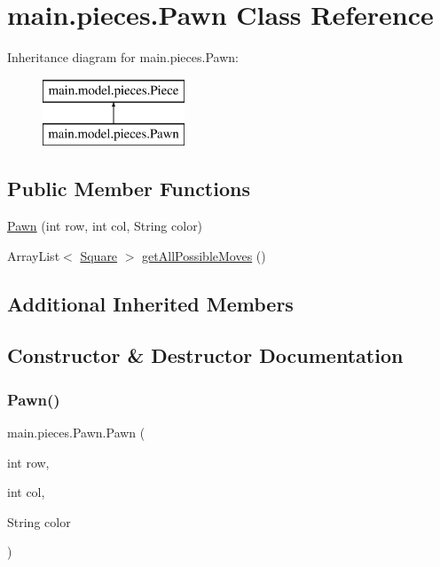 \hypertarget{classmain_1_1pieces_1_1_pawn}{}\section{main.\+pieces.\+Pawn Class Reference}
\label{classmain_1_1pieces_1_1_pawn}
Inheritance diagram for main.\+pieces.\+Pawn\+:\begin{figure}[H]
\begin{center}
\leavevmode
\includegraphics[height=2.000000cm]{classmain_1_1pieces_1_1_pawn}
\end{center}
\end{figure}
\subsection*{Public Member Functions}
\begin{DoxyCompactItemize}
\item 
\hyperlink{classmain_1_1pieces_1_1_pawn_a3041fdffa3e3f9688e7e995bff9a60db}{Pawn} (int row, int col, String color)
\item 
Array\+List$<$ \hyperlink{classmain_1_1_square}{Square} $>$ \hyperlink{classmain_1_1pieces_1_1_pawn_af772977e7eb1cc1b463531db4c3627aa}{get\+All\+Possible\+Moves} ()
\end{DoxyCompactItemize}
\subsection*{Additional Inherited Members}


\subsection{Constructor \& Destructor Documentation}
\mbox{\label{classmain_1_1pieces_1_1_pawn_a3041fdffa3e3f9688e7e995bff9a60db}} 
\subsubsection{\texorpdfstring{Pawn()}{Pawn()}}
{\footnotesize\ttfamily main.\+pieces.\+Pawn.\+Pawn (\begin{DoxyParamCaption}\item[{int}]{row,  }\item[{int}]{col,  }\item[{String}]{color }\end{DoxyParamCaption})\hspace{0.3cm}{\ttfamily [inline]}}

